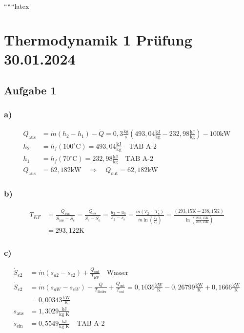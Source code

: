 
``````latex


\section*{Thermodynamik 1 Prüfung 30.01.2024}
\subsection*{Aufgabe 1}

\subsubsection*{a)}
\begin{align*}
Q_{\text{aus}} &= \dot{m}(h_2 - h_1) - \dot{Q} = 0,3 \frac{\text{kg}}{\text{s}} (493,04 \frac{\text{kJ}}{\text{kg}} - 232,98 \frac{\text{kJ}}{\text{kg}}) - 100 \text{kW} \\
h_2 &= h_f (100^\circ \text{C}) = 493,04 \frac{\text{kJ}}{\text{kg}} \quad \text{TAB A-2} \\
h_1 &= h_f (70^\circ \text{C}) = 232,98 \frac{\text{kJ}}{\text{kg}} \quad \text{TAB A-2} \\
Q_{\text{aus}} &= 62,182 \text{kW} \quad \Rightarrow \quad Q_{\text{out}} = 62,182 \text{kW}
\end{align*}

\subsubsection*{b)}
\begin{align*}
T_{KF} &= \frac{Q_{\text{aus}}}{\dot{S}_{\text{aus}} - \dot{S}_e} = \frac{Q_{\text{ew}}}{\dot{S}_e - \dot{S}_a} = \frac{u_2 - u_0}{s_2 - s_e} = \frac{\dot{m} (T_2 - T_e)}{\dot{m} \ln \left( \frac{T_2}{T_e} \right)} = \frac{(293,15 \text{K} - 238,15 \text{K})}{\ln \left( \frac{293,15 \text{K}}{238,15 \text{K}} \right)} \\
&= 293,122 \text{K}
\end{align*}

\subsubsection*{c)}
\begin{align*}
\dot{S}_{e2} &= \dot{m} (s_{a2} - s_{e2}) + \frac{Q_{\text{out}}}{T_{KF}} \quad \text{Wasser} \\
\dot{S}_{e2} &= \dot{m} (s_{aW} - s_{eW}) - \frac{\dot{Q}}{T_{\text{Boiler}}} + \frac{Q_{\text{out}}}{T_{\text{out}}} = 0,1036 \frac{\text{kW}}{\text{K}} - 0,26799 \frac{\text{kW}}{\text{K}} + 0,1666 \frac{\text{kW}}{\text{K}} \\
&= 0,00343 \frac{\text{kW}}{\text{K}} \\
s_{\text{aus}} &= 1,3029 \frac{\text{kJ}}{\text{kg K}} \\
s_{\text{ein}} &= 0,5549 \frac{\text{kJ}}{\text{kg K}} \quad \text{TAB A-2}
\end{align*}

